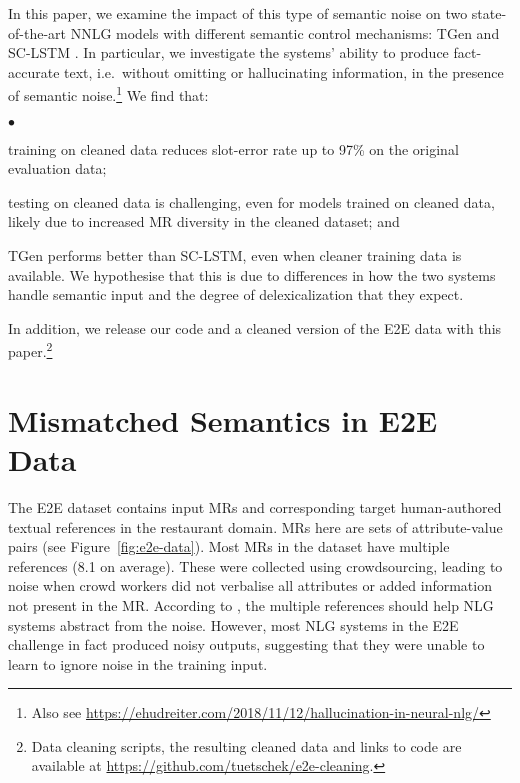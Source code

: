 \documentclass[11pt,a4paper]{article}
\newcommand{\squishlist}{
 \begin{list}{$\bullet$}
  { \setlength{\itemsep}{0pt}
     \setlength{\parsep}{2pt}
     \setlength{\topsep}{2pt}
     \setlength{\partopsep}{0pt}
     \setlength{\leftmargin}{1em}
     \setlength{\labelwidth}{1em}
     \setlength{\labelsep}{0.4em} } }
\newcommand{\squishend}{
  \end{list}  }
\begin{document}
In this paper, we examine the impact of this type of semantic noise on two state-of-the-art NNLG models with different semantic control mechanisms: TGen \cite{Dusek:ACL16} and SC-LSTM \cite{wen:emnlp2015}.
In particular, we investigate the systems' ability to produce fact-accurate text, i.e.\ without omitting or hallucinating information, in the presence of semantic noise.\footnote{Also see \url{https://ehudreiter.com/2018/11/12/hallucination-in-neural-nlg/}}
We find that:
\squishlist
    \item training on cleaned data reduces slot-error rate up to 97\% on the original evaluation data;
\item testing on cleaned data is challenging, even for models trained on cleaned data, likely due to increased MR diversity in the cleaned dataset; and
\item TGen performs better than SC-LSTM, even when cleaner training data is available. We hypothesise that this is due to differences in how the two systems handle semantic input and the degree of delexicalization that they expect.\squishend

In addition, we release our code and a cleaned version of the E2E data with this paper.\footnote{Data cleaning scripts, the resulting cleaned data and links to code are available at \url{https://github.com/tuetschek/e2e-cleaning}.} 



\section{Mismatched Semantics in E2E Data}
\label{sec:mismatched-semantics}

The E2E dataset contains input MRs and corresponding target human-authored textual references in the restaurant domain. 
MRs here are sets of attribute-value pairs (see Figure~\ref{fig:e2e-data}). 
Most MRs in the dataset have multiple references (8.1 on average).
These were collected using crowdsourcing, leading to noise when crowd workers did not verbalise all attributes or added information not present in the MR. 
According to \citet{dusek_evaluating_2019}, the multiple references should help NLG systems abstract from the noise. 
However, most NLG systems in the E2E challenge in fact produced noisy outputs, suggesting that they were unable to learn to ignore noise in the training input.
\end{document}
